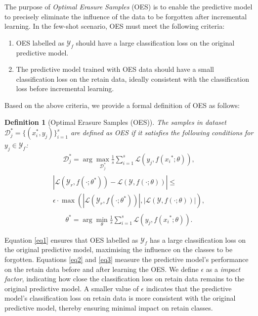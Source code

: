 \documentclass[preprint,12pt]{elsarticle}
\newtheorem{definition}{Definition}
\begin{document}
The purpose of \textit{Optimal Erasure Samples} (OES) is to enable the predictive model to precisely eliminate the influence of the data to be forgotten after incremental learning. In the few-shot scenario, OES must meet the following criteria:

\begin{enumerate}
  \item OES labelled as $\mathcal{Y}_f$ should have a large classification loss on the original predictive model.
  \item The predictive model trained with OES data should have a small classification loss on the retain data, ideally consistent with the classification loss before incremental learning.
\end{enumerate}

Based on the above criteria, we provide a formal definition of OES as follows:

\begin{definition}[Optimal Erasure Samples (OES)]
    The samples in dataset \( \mathcal{D}_j^* = \{(x_i^*, y_{j})\}_{i=1}^s \) are defined as OES if it satisfies the following conditions for \( y_{j} \in \mathcal{Y}_f \):
    \begin{align}
    \mathcal{D}_j^* = \arg\max_{\mathcal{D}_j^*} \frac{1}{s} \sum_{i=1}^{s} \mathcal{L}(y_{j}, f({x_i}^*; \theta)), \label{eq1}
    \end{align}
    \begin{align}
    \begin{split}
    |\mathcal{L}(\mathcal{Y}_{r}, f(\cdot; \theta^*)) - \mathcal{L}(\mathcal{Y}, f(\cdot; \theta))| \leq ~~~~~~~~~~~~~~~\\
    \epsilon \cdot \max(|\mathcal{L}(\mathcal{Y}_{r}, f(\cdot; \theta^*))|, |\mathcal{L}(\mathcal{Y}, f(\cdot; \theta))|), \label{eq2}
    \end{split}
    \end{align}
    \begin{align}
    \theta^* = \arg\min_{\theta} \frac{1}{s} \sum_{i=1}^{s} \mathcal{L}(y_{j}, f({x_i}^*; \theta)). \label{eq3}
    \end{align}
\end{definition}

Equation \ref{eq1} ensures that OES labelled as $\mathcal{Y}_f$ has a large classification loss on the original predictive model, maximising the influence on the classes to be forgotten. Equations \ref{eq2} and \ref{eq3} measure the predictive model's performance on the retain data before and after learning the OES. We define $\epsilon$ as a \textit{impact factor}, indicating how close the classification loss on retain data remains to the original predictive model. A smaller value of $\epsilon$ indicates that the predictive model's classification loss on retain data is more consistent with the original predictive model, thereby ensuring minimal impact on retain classes.
\end{document}
